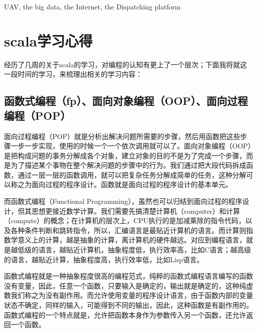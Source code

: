 \documentclass[UTF8,a4paper,10pt,nocolorlinks]{ctexart}
\begin{document}
  \begin{keywords}
      \noindent UAV, the big data, the Internet, the Dispatching platform  
  \end{keywords}
  \thispagestyle{empty} %
  \clearpage %
    

\section{scala学习心得}
经历了几周的关于scala的学习，对编程的认知有更上了一个层次；下面我将就这一段时间的学习，来梳理出相关的学习内容：
\subsection{函数式编程（fp）、面向对象编程（OOP）、面向过程编程（POP）}
面向过程编程（POP）就是分析出解决问题所需要的步骤，然后用函数把这些步骤一步一步实现，使用的时候一个一个依次调用就可以了。面向对象编程（OOP）是把构成问题的事务分解成各个对象，建立对象的目的不是为了完成一个步骤，而是为了描述某个事物在整个解决问题的步骤中的行为。我们通过把大段代码拆成函数，通过一层一层的函数调用，就可以把复杂任务分解成简单的任务，这种分解可以称之为面向过程的程序设计。函数就是面向过程的程序设计的基本单元。\par
而函数式编程（Functional Programming），虽然也可以归结到面向过程的程序设计，但其思想更接近数学计算。我们需要先搞清楚计算机（computer）和计算（compute）的概念；在计算机的层次上，CPU执行的是加减乘除的指令代码，以及各种条件判断和跳转指令，所以，汇编语言是最贴近计算机的语言。而计算则指数学意义上的计算，越是抽象的计算，离计算机的硬件越远。对应到编程语言，就是越低级的语言，越贴近计算机，抽象程度低，执行效率高，比如C语言；越高级的语言，越贴近计算，抽象程度高，执行效率低，比如Lisp语言。\par
函数式编程就是一种抽象程度很高的编程范式，纯粹的函数式编程语言编写的函数没有变量，因此，任意一个函数，只要输入是确定的，输出就是确定的，这种纯虚数我们称之为没有副作用。而允许使用变量的程序设计语言，由于函数内部的变量状态不确定，同样的输入，可能得到不同的输出，因此，这种函数是有副作用的。函数式编程的一个特点就是，允许把函数本身作为参数传入另一个函数，还允许返回一个函数。\par
\end{document}
